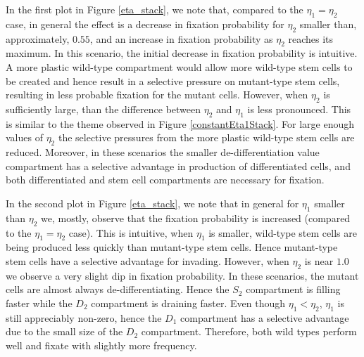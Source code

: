 \documentclass[12pt]{article}
\begin{document}
In the first plot in Figure \ref{eta_stack}, we note that, compared to the $\eta_1=\eta_2$ case, in general the effect is a decrease in fixation probability for $\eta_2$ smaller than, approximately, $0.55$, and an increase in fixation probability as $\eta_2$ reaches its maximum. In this scenario, the initial decrease in fixation probability is intuitive. A more plastic wild-type compartment would allow more wild-type stem cells to be created and hence result in a selective pressure on mutant-type stem cells, resulting in less probable fixation for the mutant cells. However, when $\eta_2$ is sufficiently large, than the difference between $\eta_2$ and $\eta_1$ is less pronounced. This is similar to the theme observed in Figure \ref{constantEta1Stack}. For large enough values of $\eta_2$ the selective pressures from the more plastic wild-type stem cells are reduced. Moreover, in these scenarios the smaller de-differentiation value compartment has a selective advantage in production of differentiated cells, and both differentiated and stem cell compartments are necessary for fixation.

In the second plot in Figure \ref{eta_stack}, we note that in general for $\eta_1$ smaller than $\eta_2$ we, mostly, observe that the fixation probability is increased (compared to the $\eta_1=\eta_2$ case). This is intuitive, when $\eta_1$ is smaller, wild-type stem cells are being produced less quickly than mutant-type stem cells. Hence mutant-type stem cells have a selective advantage for invading. However, when $\eta_2$ is near $1.0$ we observe a very slight dip in fixation probability. In these scenarios, the mutant cells are almost always de-differentiating. Hence the $S_2$ compartment is filling faster while the $D_2$ compartment is draining faster. Even though $\eta_1<\eta_2$, $\eta_1$ is still appreciably non-zero, hence the $D_1$ compartment has a selective advantage due to the small size of the $D_2$ compartment. Therefore, both wild types perform well and fixate with slightly more frequency.
\end{document}
